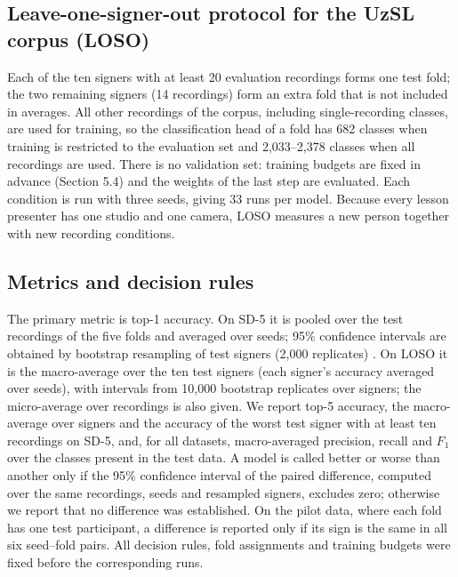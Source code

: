 \hypertarget{leave-one-signer-out-protocol-for-the-uzsl-corpus-loso}{%
\subsection{Leave-one-signer-out protocol for the UzSL corpus (LOSO)}\label{leave-one-signer-out-protocol-for-the-uzsl-corpus-loso}}

Each of the ten signers with at least 20 evaluation recordings forms one test fold; the two remaining signers (14 recordings) form an extra fold that is not included in averages. All other recordings of the corpus, including single-recording classes, are used for training, so the classification head of a fold has 682 classes when training is restricted to the evaluation set and 2,033--2,378 classes when all recordings are used. There is no validation set: training budgets are fixed in advance (Section 5.4) and the weights of the last step are evaluated. Each condition is run with three seeds, giving 33 runs per model. Because every lesson presenter has one studio and one camera, LOSO measures a new person together with new recording conditions.

\hypertarget{metrics-and-decision-rules}{%
\subsection{Metrics and decision rules}\label{metrics-and-decision-rules}}

The primary metric is top-1 accuracy. On SD-5 it is pooled over the test recordings of the five folds and averaged over seeds; 95\% confidence intervals are obtained by bootstrap resampling of test signers (2,000 replicates) \citep{2016_efron_hastie_casi}. On LOSO it is the macro-average over the ten test signers (each signer's accuracy averaged over seeds), with intervals from 10,000 bootstrap replicates over signers; the micro-average over recordings is also given. We report top-5 accuracy, the macro-average over signers and the accuracy of the worst test signer with at least ten recordings on SD-5, and, for all datasets, macro-averaged precision, recall and \(F_1\) over the classes present in the test data. A model is called better or worse than another only if the 95\% confidence interval of the paired difference, computed over the same recordings, seeds and resampled signers, excludes zero; otherwise we report that no difference was established. On the pilot data, where each fold has one test participant, a difference is reported only if its sign is the same in all six seed--fold pairs. All decision rules, fold assignments and training budgets were fixed before the corresponding runs.

